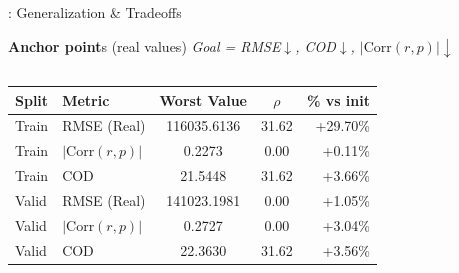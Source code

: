 \documentclass[aspectratio=169,10pt]{beamer}
\newcommand{\cRMSE}{blue!70!black}
\newcommand{\cCORR}{red!75!black}
\newcommand{\cCOD}{green!60!black}
\begin{document}
\begin{frame}{\sectionY: Generalization \& Tradeoffs}
\begin{block}{  \footnotesize {} \textbf{Anchor point}s (real values) \;\; \textit{Goal = RMSE$\downarrow$, COD$\downarrow$, $|\mathrm{Corr}(r,p)|\downarrow$}}
\begin{columns}

\begin{tabular}{@{}ll S[table-format=6.4] S[table-format=2.2] r@{}}
\toprule
Split & Metric & \textbf{Worst Value} & {$\rho$} & {\% vs init} \\
\midrule
Train & \textcolor{\cRMSE}{RMSE (Real)}            & 116035.6136 & 31.62 & \textcolor{\cRMSE}{+29.70\%} \\
Train & \textcolor{\cCORR}{$|\mathrm{Corr}(r,p)|$} & 0.2273      & 0.00  & \textcolor{\cCORR}{+0.11\%} \\
Train & \textcolor{\cCOD}{COD}                     & 21.5448     & 31.62 & \textcolor{\cCOD}{+3.66\%} \\
\addlinespace[0.8mm]
Valid & \textcolor{\cRMSE}{RMSE (Real)}            & 141023.1981 & 0.00  & \textcolor{\cRMSE}{+1.05\%} \\
Valid & \textcolor{\cCORR}{$|\mathrm{Corr}(r,p)|$} & 0.2727      & 0.00  & \textcolor{\cCORR}{+3.04\%} \\
Valid & \textcolor{\cCOD}{COD}                     & 22.3630     & 31.62 & \textcolor{\cCOD}{+3.56\%} \\
\bottomrule
\end{tabular}

\end{columns}



\end{block}
\end{frame}
\end{document}

